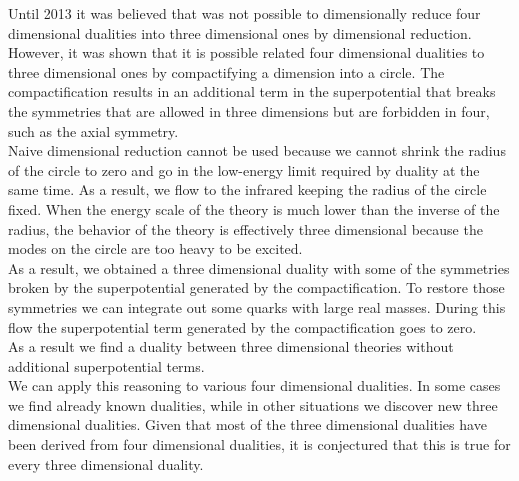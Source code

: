 Until 2013 it was believed that was not possible to dimensionally reduce four dimensional dualities into three dimensional ones by dimensional reduction.
However, it was shown that it is possible related four dimensional dualities to three dimensional ones by compactifying a dimension into a circle.
The compactification results in an additional term in the superpotential that breaks the symmetries that are allowed in three dimensions but are forbidden in four, such as the axial symmetry.\\
Naive dimensional reduction cannot be used because we cannot shrink the radius of the circle to zero and go in the low-energy limit required by duality at the same time.
As a result, we flow to the infrared keeping the radius of the circle fixed.
When the energy scale of the theory is much lower than the inverse of the radius, the behavior of the theory is effectively three dimensional because the modes on the circle are too heavy to be excited.\\
As a result, we obtained a three dimensional duality with some of the symmetries broken by the superpotential generated by the compactification. 
To restore those symmetries we can integrate out some quarks with large real masses. During this flow the superpotential term generated by the compactification goes to zero. \\
As a result we find a duality between three dimensional theories without additional superpotential terms.\\
We can apply this reasoning to various four dimensional dualities. 
In some cases we find already known dualities, while in other situations we discover new three dimensional dualities. 
Given that most of the three dimensional dualities have been derived from four dimensional dualities, it is conjectured that this is true for every three dimensional duality.\\

